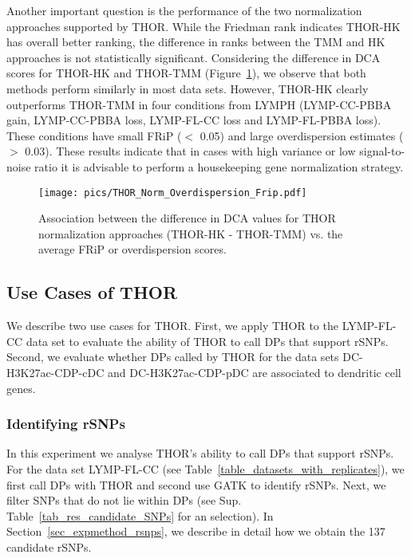 Another important question is the performance of the two normalization approaches supported by THOR. 
While the Friedman rank indicates THOR-HK has overall better ranking, the difference in ranks between the TMM and HK approaches is not statistically significant. 
Considering the difference in DCA scores for THOR-HK and THOR-TMM (Figure~\ref{pic_delta_DCA_THOR}), we observe that both methods perform similarly in most data sets. 
However, THOR-HK clearly outperforms THOR-TMM in four conditions from LYMPH (LYMP-CC-PBBA gain, LYMP-CC-PBBA loss, LYMP-FL-CC loss and LYMP-FL-PBBA loss). 
These conditions have small FRiP ($<$ 0.05) and large overdispersion estimates ($>$ 0.03). 
These results indicate that in cases with high variance or low signal-to-noise ratio it is advisable to perform a housekeeping gene normalization strategy.

\begin{figure}[h]
  \begin{center}
    \texttt{[image: pics/THOR\_Norm\_Overdispersion\_Frip.pdf]}
  \end{center}
  \caption[Association DCA THOR vs. FRiP and Overdispersion]{Association between the difference in DCA values for THOR normalization approaches (THOR-HK - THOR-TMM) vs. the average FRiP or overdispersion scores.}
  \label{pic_delta_DCA_THOR}
\end{figure}

\subsection{Use Cases of THOR}
We describe two use cases for THOR.
First, we apply THOR to the LYMP-FL-CC data set to evaluate the ability of THOR to call DPs that support rSNPs.
Second, we evaluate whether DPs called by THOR for the data sets DC-H3K27ac-CDP-cDC and DC-H3K27ac-CDP-pDC are associated to dendritic cell genes.

\subsubsection{Identifying rSNPs}
\label{res_ident_rsnps}
In this experiment we analyse THOR's ability to call DPs that support rSNPs.
For the data set LYMP-FL-CC (see Table~\ref{table_datasets_with_replicates}), we first call DPs with THOR and second use GATK to identify rSNPs.
Next, we filter SNPs that do not lie within DPs (see Sup. Table~\ref{tab_res_candidate_SNPs} for an selection).
In Section~\ref{sec_expmethod_rsnps}, we describe in detail how we obtain the 137 candidate rSNPs.

